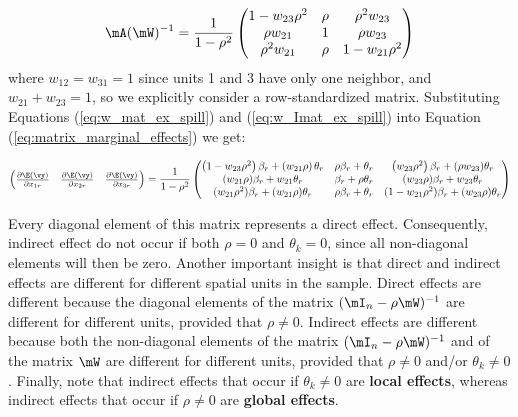 \documentclass[english,12pt]{book}\usepackage[]{graphicx}\usepackage[]{xcolor}
\begin{document}
\begin{equation}\label{eq:w_Imat_ex_spill}
  \mA(\mW)^{-1} = \frac{1}{1 - \rho^2}
  \begin{pmatrix}
          1 - w_{23}\rho^2     & \rho & \rho^2 w_{23}\\
          \rho w_{21} & 1 & \rho w_{23} \\
          \rho^2 w_{21}      & \rho & 1 - w_{21}\rho^2 
        \end{pmatrix}
\end{equation}
%
where $w_{12} = w_{31}= 1$ since units 1 and 3 have only one neighbor, and $w_{21} + w_{23} = 1$, so we explicitly consider a row-standardized matrix.  Substituting Equations (\ref{eq:w_mat_ex_spill}) and (\ref{eq:w_Imat_ex_spill}) into Equation (\ref{eq:matrix_marginal_effects}) we get:

\begin{equation*}
  \begin{pmatrix}
  \frac{\partial \E(\vy)}{\partial x_{1r}} & \frac{\partial \E(\vy)}{\partial x_{2r}} & \frac{\partial \E(\vy)}{\partial x_{3r}} 
   \end{pmatrix} = \frac{1}{1 - \rho^2}
   \begin{pmatrix}
    \left(1 -  w_{23}\rho^2\right)\beta_r + \left(w_{21}\rho\right) \theta_r & \rho \beta_r + \theta_r & \left(w_{23}\rho^2\right)\beta_r + (\rho w_{23})\theta_r \\
    (w_{21}\rho)\beta_r + w_{21}\theta_r & \beta_r + \rho \theta_r & (w_{23}\rho)\beta_r + w_{23}\theta_r \\
    (w_{21}\rho^2)\beta_r + (w_{21}\rho)\theta_r & \rho \beta_r + \theta_r & (1 -  w_{21}\rho^2)\beta_r + (w_{23}\rho)\theta_r
   \end{pmatrix}
\end{equation*}

Every diagonal element of this matrix represents a direct effect. Consequently, indirect effect do not occur if both $\rho = 0$ and $\theta_k = 0$, since all non-diagonal elements will then be zero. Another important insight is that direct and indirect effects are different for different spatial units in the sample. Direct effects are different because the diagonal elements of the matrix $(\mI_n - \rho\mW)^{-1}$ are different for different units, provided that $\rho \neq 0$. Indirect effects are different because both the non-diagonal elements of the matrix $(\mI_n - \rho\mW)^{-1}$ and of the matrix $\mW$ are different for different units, provided that $\rho \neq 0$ and/or $\theta_k\neq 0$. Finally, note that indirect effects that occur if $\theta_k\neq 0$ are \textbf{local effects}, whereas indirect effects that occur if $\rho\neq 0$ are \textbf{global effects}. 
\end{document}
